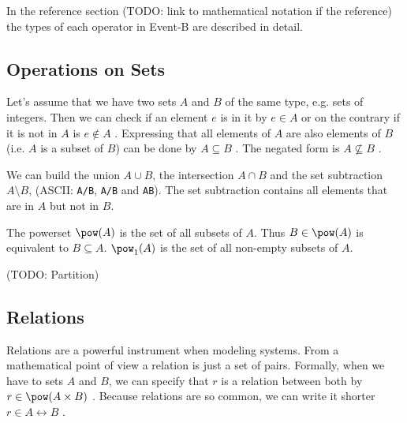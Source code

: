 
In the reference section (TODO: link to mathematical notation if the reference) the types of each operator in Event-B are described in detail.

\subsection{Operations on Sets}
\label{tut:operations_on_sets}
Let's assume that we have two sets $A$ and $B$ of the same type, e.g. sets of integers.
Then we can check if an element $e$ is in it by $e\in A$  or 
on the contrary if it is not in $A$ is $e\notin A$ .
Expressing that all elements of $A$ are also elements of $B$ (i.e. $A$ is a subset of $B$) can
be done by $A\subseteq B$ . The negated form is $A\not\subseteq B$ .

We can build the union $A\cup B$, the intersection $A\cap B$ and the set subtraction $A\setminus B$,
(ASCII: \texttt{A\mybackslash{}/B}, \texttt{A/\mybackslash{}B} and \texttt{A\mybackslash{}B}). The
set subtraction contains all elements that are in $A$ but not in $B$.

The powerset $\pow(A)$  is the set of all subsets of $A$.
Thus $B\in\pow(A)$ is equivalent to $B\subseteq A$.
$\pow_1(A)$  is the set of all non-empty subsets of $A$.

(TODO: Partition)



\subsection{Relations}
\label{tut:relations}
Relations are a powerful instrument when modeling systems. From a mathematical point of view a
relation is just a set of pairs. Formally, when we have to sets $A$ and $B$, we can specify that
$r$ is a relation between both by $r \in \pow(A\cprod B)$ .
Because relations are so common, we can write it shorter $r \in A\rel B$ .

